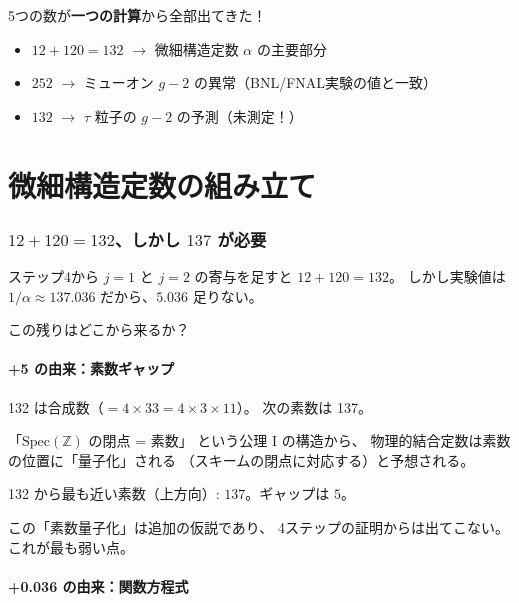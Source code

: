 \documentclass[11pt,a4paper]{article}
\begin{document}
\begin{resultbox}
5つの数が\textbf{一つの計算}から全部出てきた！

\begin{itemize}
\item $12 + 120 = 132$ $\to$ 微細構造定数 $\alpha$ の主要部分
\item $252$ $\to$ ミューオン $g-2$ の異常（BNL/FNAL実験の値と一致）
\item $132$ $\to$ $\tau$ 粒子の $g-2$ の予測（未測定！）
\end{itemize}
\end{resultbox}

\part{微細構造定数の組み立て}

\section{$12 + 120 = 132$、しかし $137$ が必要}

ステップ4から $j=1$ と $j=2$ の寄与を足すと $12 + 120 = 132$。
しかし実験値は $1/\alpha \approx 137.036$ だから、$5.036$ 足りない。

この残りはどこから来るか？

\subsection{+5 の由来：素数ギャップ}

132 は合成数（$= 4 \times 33 = 4 \times 3 \times 11$）。
次の素数は 137。

「$\text{Spec}(\mathbb{Z})$ の閉点 = 素数」
という公理 I の構造から、
物理的結合定数は素数の位置に「量子化」される
（スキームの閉点に対応する）と予想される。

132 から最も近い素数（上方向）: $137$。ギャップは $5$。

\begin{honestbox}[正直に]
この「素数量子化」は追加の仮説であり、
4ステップの証明からは出てこない。
これが最も弱い点。
\end{honestbox}

\subsection{+0.036 の由来：関数方程式}
\end{document}
